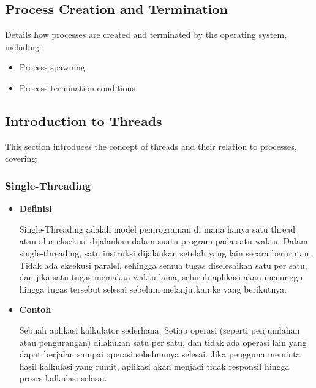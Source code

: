 \documentclass[12pt]{article}
\begin{document}
\subsection{Process Creation and Termination}
Details how processes are created and terminated by the operating system, including:
\begin{itemize}
    \item Process spawning
    \item Process termination conditions
\end{itemize}

\subsection{Introduction to Threads}
This section introduces the concept of threads and their relation to processes, covering:
\subsubsection{Single-Threading}
\begin{itemize}
    \item\textbf{Definisi} 
    \par \hspace{2em} Single-Threading adalah model pemrograman di mana hanya satu thread atau alur eksekusi dijalankan dalam suatu program pada satu waktu. Dalam single-threading, satu instruksi dijalankan setelah yang lain secara berurutan. Tidak ada eksekusi paralel, sehingga semua tugas diselesaikan satu per satu, dan jika satu tugas memakan waktu lama, seluruh aplikasi akan menunggu hingga tugas tersebut selesai sebelum melanjutkan ke yang berikutnya.
    \item\textbf{Contoh}
    \par \hspace{2em} Sebuah aplikasi kalkulator sederhana: Setiap operasi (seperti penjumlahan atau pengurangan) 	dilakukan satu per satu, dan tidak ada operasi lain yang dapat berjalan sampai operasi sebelumnya selesai. Jika pengguna meminta hasil kalkulasi yang rumit, aplikasi akan menjadi tidak responsif hingga proses kalkulasi selesai.
\end{itemize}
\end{document}
